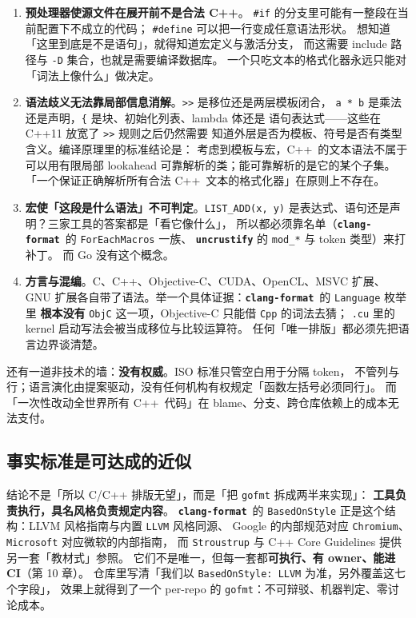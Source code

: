 \documentclass[12pt,a4paper,fontset=fandol]{ctexbook}
\newcommand{\cpp}[1]{C++#1}
\newcommand{\Lib}[1]{\textbf{\texttt{#1}}}
\newcommand{\Lang}[1]{\textsf{#1}}
\newcommand{\CL}{\Lang{C}}
\newcommand{\CPP}{\Lang{C++}}
\newcommand{\Fmt}{\Lib{clang-format}}
\begin{document}
\begin{enumerate}
  \item \textbf{预处理器使源文件在展开前不是合法 \CPP}。
    \texttt{\#if} 的分支里可能有一整段在当前配置下不成立的代码；
    \texttt{\#define} 可以把一行变成任意语法形状。
    想知道「这里到底是不是语句」，就得知道宏定义与激活分支，
    而这需要 include 路径与 \texttt{-D} 集合，也就是需要编译数据库。
    一个只吃文本的格式化器永远只能对「词法上像什么」做决定。
  \item \textbf{语法歧义无法靠局部信息消解}。\texttt{>>} 是移位还是两层模板闭合，
    \texttt{a * b} 是乘法还是声明，\texttt{\{} 是块、初始化列表、lambda 体还是
    语句表达式——这些在 \cpp{11} 放宽了 \texttt{>>} 规则之后仍然需要
    知道外层是否为模板、符号是否有类型含义。编译原理里的标准结论是：
    考虑到模板与宏，\CPP\ 的文本语法不属于可以用有限局部 lookahead
    可靠解析的类；能可靠解析的是它的某个子集。
    「一个保证正确解析所有合法 \CPP\ 文本的格式化器」在原则上不存在。
  \item \textbf{宏使「这段是什么语法」不可判定}。\texttt{LIST\_ADD(x, y)}
    是表达式、语句还是声明？三家工具的答案都是「看它像什么」，
    所以都必须靠名单（\Fmt\ 的 \texttt{ForEachMacros} 一族、
    \Lib{uncrustify} 的 \texttt{mod\_*} 与 token 类型）来打补丁。
    而 Go 没有这个概念。
  \item \textbf{方言与混编}。\CL、\CPP、Objective-C、CUDA、OpenCL、MSVC 扩展、
    GNU 扩展各自带了语法。举一个具体证据：\Fmt\ 的 \texttt{Language} 枚举里
    \textbf{根本没有} \texttt{ObjC} 这一项，Objective-C 只能借 \texttt{Cpp} 的词法去猜；
    \texttt{.cu} 里的 kernel 启动写法会被当成移位与比较运算符。
    任何「唯一排版」都必须先把语言边界谈清楚。
\end{enumerate}

还有一道非技术的墙：\textbf{没有权威}。ISO 标准只管空白用于分隔 token，
不管列与行；语言演化由提案驱动，没有任何机构有权规定「函数左括号必须同行」。
而「一次性改动全世界所有 \CPP\ 代码」在 blame、分支、跨仓库依赖上的成本无法支付。

\subsection{事实标准是可达成的近似}\label{sec:ch11-s4-fact}

结论不是「所以 C/C++ 排版无望」，而是「把 \texttt{gofmt} 拆成两半来实现」：
\textbf{工具负责执行，具名风格负责规定内容}。
\Fmt\ 的 \texttt{BasedOnStyle} 正是这个结构：LLVM 风格指南与内置 \texttt{LLVM} 风格同源、
Google 的内部规范对应 \texttt{Chromium}、\texttt{Microsoft} 对应微软的内部指南，
而 \texttt{Stroustrup} 与 C++ Core Guidelines 提供另一套「教材式」参照。
它们不是唯一，但每一套都\textbf{可执行、有 owner、能进 CI}（第 10 章）。
仓库里写清「我们以 \texttt{BasedOnStyle: LLVM} 为准，另外覆盖这七个字段」，
效果上就得到了一个 per-repo 的 \texttt{gofmt}：不可辩驳、机器判定、零讨论成本。
\end{document}
